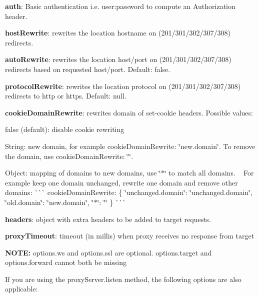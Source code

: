 \begin{DoxyItemize}
\item {\bfseries auth}\+: Basic authentication i.\+e. \textquotesingle{}user\+:password\textquotesingle{} to compute an Authorization header.
\item {\bfseries host\+Rewrite}\+: rewrites the location hostname on (201/301/302/307/308) redirects.
\item {\bfseries auto\+Rewrite}\+: rewrites the location host/port on (201/301/302/307/308) redirects based on requested host/port. Default\+: false.
\item {\bfseries protocol\+Rewrite}\+: rewrites the location protocol on (201/301/302/307/308) redirects to \textquotesingle{}http\textquotesingle{} or \textquotesingle{}https\textquotesingle{}. Default\+: null.
\item {\bfseries cookie\+Domain\+Rewrite}\+: rewrites domain of {\ttfamily set-\/cookie} headers. Possible values\+:
\begin{DoxyItemize}
\item {\ttfamily false} (default)\+: disable cookie rewriting
\item String\+: new domain, for example {\ttfamily cookie\+Domain\+Rewrite\+: \char`\"{}new.\+domain\char`\"{}}. To remove the domain, use {\ttfamily cookie\+Domain\+Rewrite\+: \char`\"{}\char`\"{}}.
\item Object\+: mapping of domains to new domains, use {\ttfamily \char`\"{}$\ast$\char`\"{}} to match all domains. ~\newline
 For example keep one domain unchanged, rewrite one domain and remove other domains\+: \`{}\`{}\`{} cookie\+Domain\+Rewrite\+: \{ \char`\"{}unchanged.\+domain\char`\"{}\+: \char`\"{}unchanged.\+domain\char`\"{}, \char`\"{}old.\+domain\char`\"{}\+: \char`\"{}new.\+domain\char`\"{}, \char`\"{}$\ast$\char`\"{}\+: \char`\"{}\char`\"{} \} \`{}\`{}\`{}
\end{DoxyItemize}
\item {\bfseries headers}\+: object with extra headers to be added to target requests.
\item {\bfseries proxy\+Timeout}\+: timeout (in millis) when proxy receives no response from target
\end{DoxyItemize}

{\bfseries N\+O\+TE\+:} {\ttfamily options.\+ws} and {\ttfamily options.\+ssl} are optional. {\ttfamily options.\+target} and {\ttfamily options.\+forward} cannot both be missing

If you are using the {\ttfamily proxy\+Server.\+listen} method, the following options are also applicable\+:


